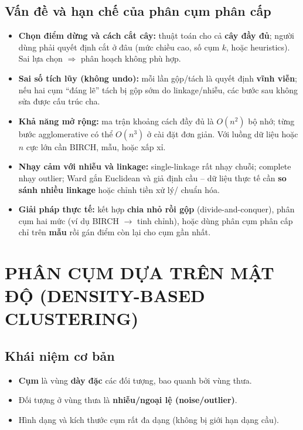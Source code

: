 \documentclass[10pt]{article}
\begin{document}
\subsection{Vấn đề và hạn chế của phân cụm phân cấp}

\begin{itemize}
    \item \textbf{Chọn điểm dừng và cách cắt cây:} thuật toán cho cả \textbf{cây đầy đủ}; người dùng phải quyết định cắt ở đâu (mức chiều cao, số cụm $k$, hoặc heuristics). Sai lựa chọn $\Rightarrow$ phân hoạch không phù hợp.

    \item \textbf{Sai số tích lũy (không undo):} mỗi lần gộp/tách là quyết định \textbf{vĩnh viễn}; nếu hai cụm ``đáng lẽ'' tách bị gộp sớm do linkage/nhiễu, các bước sau không sửa được cấu trúc cha.

    \item \textbf{Khả năng mở rộng:} ma trận khoảng cách đầy đủ là $O(n^2)$ bộ nhớ; từng bước agglomerative có thể $O(n^3)$ ở cài đặt đơn giản. Với luồng dữ liệu hoặc $n$ cực lớn cần BIRCH, mẫu, hoặc xấp xỉ.

    \item \textbf{Nhạy cảm với nhiễu và linkage:} single-linkage rất nhạy chuỗi; complete nhạy outlier; Ward gắn Euclidean và giả định cầu -- dữ liệu thực tế cần \textbf{so sánh nhiều linkage} hoặc chỉnh tiền xử lý/ chuẩn hóa.

    \item \textbf{Giải pháp thực tế:} kết hợp \textbf{chia nhỏ rồi gộp} (divide-and-conquer), phân cụm hai mức (ví dụ BIRCH $\to$ tinh chỉnh), hoặc dùng phân cụm phân cấp chỉ trên \textbf{mẫu} rồi gán điểm còn lại cho cụm gần nhất.
\end{itemize}

\section{PHÂN CỤM DỰA TRÊN MẬT ĐỘ (DENSITY-BASED CLUSTERING)}

\subsection{Khái niệm cơ bản}

\begin{itemize}
    \item \textbf{Cụm} là vùng \textbf{dày đặc} các đối tượng, bao quanh bởi vùng thưa.
    \item Đối tượng ở vùng thưa là \textbf{nhiễu/ngoại lệ (noise/outlier)}.
    \item Hình dạng và kích thước cụm rất đa dạng (không bị giới hạn dạng cầu).
\end{itemize}
\end{document}
